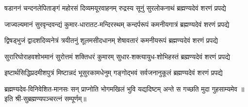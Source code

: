 
\fourlineindentedshloka
{षडाननं चन्दनलेपिताङ्गं}
{महोरसं दिव्यमयूरवाहनम्}
{रुद्रस्य सूनुं सुरलोकनाथं}
{ब्रह्मण्यदेवं शरणं प्रपद्ये}

\fourlineindentedshloka
{जाज्वल्यमानं सुरवृन्दवन्द्यं}
{कुमार-धारातट-मन्दिरस्थम्}
{कन्दर्परूपं कमनीयगात्रं}
{ब्रह्मण्यदेवं शरणं प्रपद्ये}

\fourlineindentedshloka
{द्विषड्भुजं द्वादशदिव्यनेत्रं}
{त्रयीतनुं शूलमसीदधानम्}
{शेषावतारं कमनीयरूपं}
{ब्रह्मण्यदेवं शरणं प्रपद्ये}

\fourlineindentedshloka
{सुरारिघोराहवशोभमानं}
{सुरोत्तमं शक्तिधरं कुमारम्}
{सुधार-शक्त्यायुध-शोभिहस्तं}
{ब्रह्मण्यदेवं शरणं प्रपद्ये}

\fourlineindentedshloka
{इष्टार्थसिद्धिप्रदमीशपुत्रं}
{मिष्टान्नदं भूसुरकामधेनुम्}
{गङ्गोद्भवं सर्वजनानुकूलं}
{ब्रह्मण्यदेवं शरणं प्रपद्ये}

{ब्रह्मण्यदेव-विनिवेशित-मानसः सन्}
{प्राप्नोति भोगमखिलं भुवि यद्यदिष्टम्}
{अन्ते स गच्छति मुदा गुहसाम्यमेव}
॥इति श्री-सुब्रह्मण्यपञ्चरत्नं सम्पूर्णम्॥

